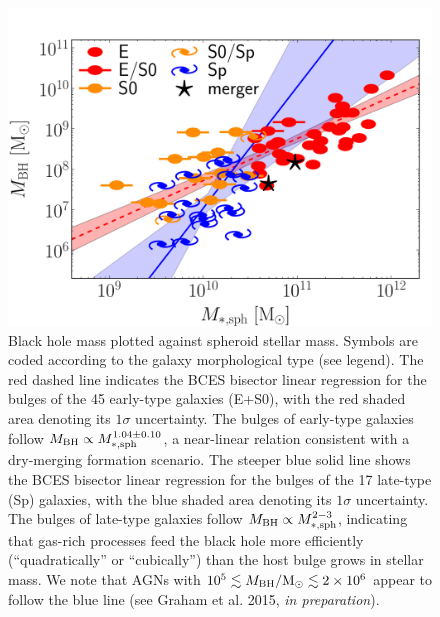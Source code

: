 \documentclass[preprint2]{emulateapj}
\begin{document}
\begin{figure}[h]
\begin{center}
\includegraphics[width=\columnwidth]{images/mbh_vs_mass_sph.pdf}
\caption{Black hole mass plotted against spheroid stellar mass. 
Symbols are coded according to the galaxy morphological type (see legend).
The red dashed line indicates the BCES bisector linear regression for the bulges of the 45 early-type galaxies (E+S0), 
with the red shaded area denoting its $1\sigma$ uncertainty. 
The bulges of early-type galaxies follow $M_{\rm BH} \propto M_{\rm *,sph}^{1.04 \pm 0.10}$,
a near-linear relation consistent with a dry-merging formation scenario.
The steeper blue solid line shows the BCES bisector linear regression for the bulges of the 17 late-type (Sp) galaxies, 
with the blue shaded area denoting its $1\sigma$ uncertainty. 
The bulges of late-type galaxies follow $M_{\rm BH} \propto M_{\rm *,sph}^{2-3}$, 
indicating that gas-rich processes feed the black hole more efficiently (``quadratically'' or ``cubically'') than the host bulge grows in stellar mass. 
We note that AGNs with $10^5 \lesssim M_{\rm BH}/{\rm M_\odot} \lesssim 2 \times 10^6$ \citep{jiang2011a} appear to follow the blue line 
(see Graham et al. 2015, \emph{in preparation}).}
\label{fig:mbhmasssph}
\end{center}
\end{figure}
\end{document}
